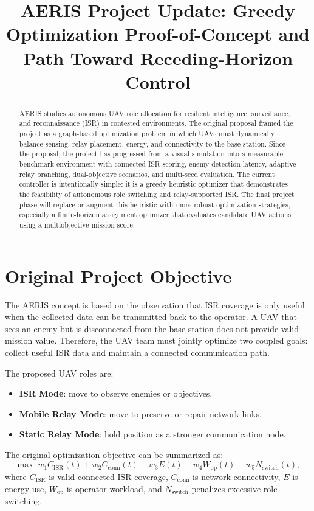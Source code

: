 \documentclass[conference]{IEEEtran}
\title{AERIS Project Update: Greedy Optimization Proof-of-Concept and Path Toward Receding-Horizon Control}
\author{
\IEEEauthorblockN{Jeewoo Choi}
\IEEEauthorblockA{
Stanford University\\
jchoi23@stanford.edu
}
}
\begin{document}
\maketitle

\begin{abstract}
AERIS studies autonomous UAV role allocation for resilient intelligence,
surveillance, and reconnaissance (ISR) in contested environments. The original
proposal framed the project as a graph-based optimization problem in which UAVs
must dynamically balance sensing, relay placement, energy, and connectivity to
the base station. Since the proposal, the project has progressed from a visual
simulation into a measurable benchmark environment with connected ISR scoring,
enemy detection latency, adaptive relay branching, dual-objective scenarios,
and multi-seed evaluation. The current controller is intentionally simple: it is
a greedy heuristic optimizer that demonstrates the feasibility of autonomous
role switching and relay-supported ISR. The final project phase will replace or
augment this heuristic with more robust optimization strategies, especially a
finite-horizon assignment optimizer that evaluates candidate UAV actions using a
multiobjective mission score.
\end{abstract}

\section{Original Project Objective}
The AERIS concept is based on the observation that ISR coverage is only useful
when the collected data can be transmitted back to the operator. A UAV that sees
an enemy but is disconnected from the base station does not provide valid
mission value. Therefore, the UAV team must jointly optimize two coupled goals:
collect useful ISR data and maintain a connected communication path.

The proposed UAV roles are:
\begin{itemize}
    \item \textbf{ISR Mode}: move to observe enemies or objectives.
    \item \textbf{Mobile Relay Mode}: move to preserve or repair network links.
    \item \textbf{Static Relay Mode}: hold position as a stronger communication node.
\end{itemize}

The original optimization objective can be summarized as:
\begin{equation}
\max \; w_1 C_{\text{ISR}}(t) + w_2 C_{\text{conn}}(t)
- w_3 E(t) - w_4 W_{\text{op}}(t) - w_5 N_{\text{switch}}(t),
\end{equation}
where $C_{\text{ISR}}$ is valid connected ISR coverage, $C_{\text{conn}}$ is
network connectivity, $E$ is energy use, $W_{\text{op}}$ is operator workload,
and $N_{\text{switch}}$ penalizes excessive role switching.
\end{document}
